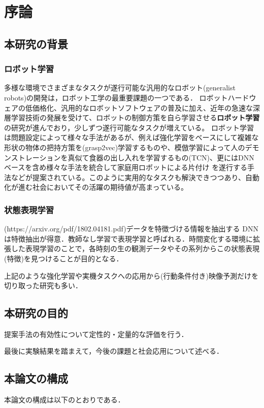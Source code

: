 \chapter{序論}
\label{chap:introduction}
\section{本研究の背景}

\subsection{ロボット学習}

多様な環境でさまざまなタスクが遂行可能な汎用的なロボット(generalist robots)の開発は，ロボット工学の最重要課題の一つである．
ロボットハードウェアの低価格化、汎用的なロボットソフトウェアの普及に加え、近年の急速な深層学習技術の発展を受けて、ロボットの制御方策を自ら学習させる{\bf ロボット学習}の研究が進んでおり，少しずつ遂行可能なタスクが増えている。
ロボット学習は問題設定によって様々な手法があるが、例えば強化学習をベースにして複雑な形状の物体の把持方策を(grasp2vec)学習するものや、模倣学習によって人のデモンストレーションを真似て食器の出し入れを学習するもの(TCN)、更にはDNNベースを含め様々な手法を統合して家庭用ロボットによる片付け \cite{hatori2018interactively}を遂行する手法などが提案されている。このように実用的なタスクも解決できつつあり、自動化が進む社会においてその活躍の期待値が高まっている。

\subsection{状態表現学習}
(https://arxiv.org/pdf/1802.04181.pdf)データを特徴づける情報を抽出する
DNNは特徴抽出が得意．教師なし学習で表現学習と呼ばれる．時間変化する環境に拡張した表現学習のことで，各時刻の生の観測データやその系列からこの状態表現(特徴)を見つけることが目的となる．


上記のような強化学習や実機タスクへの応用から(行動条件付き)映像予測だけを切り取った研究も多い．

\section{本研究の目的}


提案手法の有効性について定性的・定量的な評価を行う．

最後に実験結果を踏まえて，今後の課題と社会応用について述べる．

\section{本論文の構成}
本論文の構成は以下のとおりである．


